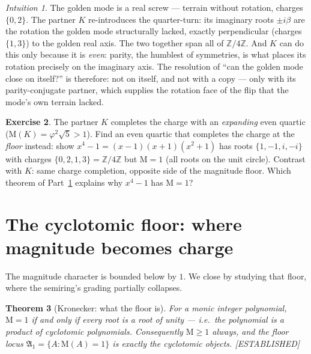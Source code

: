 \documentclass[11pt]{article}
\newcommand{\A}{𝔄}
\theoremstyle{plain}
\newtheorem{theorem}{Theorem}[section]
\theoremstyle{definition}
\newtheorem{exercise}[theorem]{Exercise}
\theoremstyle{remark}
\newtheorem{intuition}[theorem]{Intuition}
\newcommand{\Estab}{\textcolor{estabc}{[ESTABLISHED]}}
\newcommand{\Mah}{\mathrm{M}}
\begin{document}
\begin{intuition}
The golden mode is a real screw --- terrain without rotation, charges $\{0,2\}$. The partner $K$ re-introduces the quarter-turn: its imaginary roots $\pm iβ$ are the rotation the golden mode structurally lacked, exactly perpendicular (charges $\{1,3\}$) to the golden real axis. The two together span all of $ℤ/4ℤ$. And $K$ can do this only because it is \emph{even}: parity, the humblest of symmetries, is what places its rotation precisely on the imaginary axis. The resolution of ``can the golden mode close on itself?'' is therefore: not on itself, and not with a copy --- only with its parity-conjugate partner, which supplies the rotation face of the flip that the mode's own terrain lacked.
\end{intuition}

\begin{exercise}\label{exr:parity-floor}
The partner $K$ completes the charge with an \emph{expanding} even quartic ($\Mah(K)=φ^{2}\sqrt5>1$). Find an even quartic that completes the charge at the \emph{floor} instead: show $x^{4}-1=(x-1)(x+1)(x^{2}+1)$ has roots $\{1,-1,i,-i\}$ with charges $\{0,2,1,3\}=ℤ/4ℤ$ but $\Mah=1$ (all roots on the unit circle). Contrast with $K$: same charge completion, opposite side of the magnitude floor. Which theorem of Part~\ref{sec:floor} explains why $x^{4}-1$ has $\Mah=1$?
\end{exercise}

\section{The cyclotomic floor: where magnitude becomes charge}\label{sec:floor}

The magnitude character is bounded below by $1$. We close by studying that floor, where the semiring's grading partially collapses.

\begin{theorem}[Kronecker: what the floor is]\label{thm:kronecker}
For a monic integer polynomial, $\Mah=1$ if and only if every root is a root of unity --- i.e.\ the polynomial is a product of cyclotomic polynomials. Consequently $\Mah≥1$ always, and the floor locus $\A_1=\{A:\Mah(A)=1\}$ is exactly the cyclotomic objects. \Estab
\end{theorem}
\end{document}
